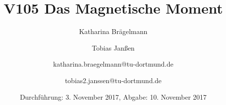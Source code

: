 
\title{V105 Das Magnetische Moment}
\author{Katharina Brägelmann \and Tobias Janßen \and katharina.braegelmann@tu-dortmund.de \and tobias2.janssen@tu-dortmund.de}
\date{Durchführung: 3. November 2017, Abgabe: 10. November 2017}
\maketitle

\tableofcontents
